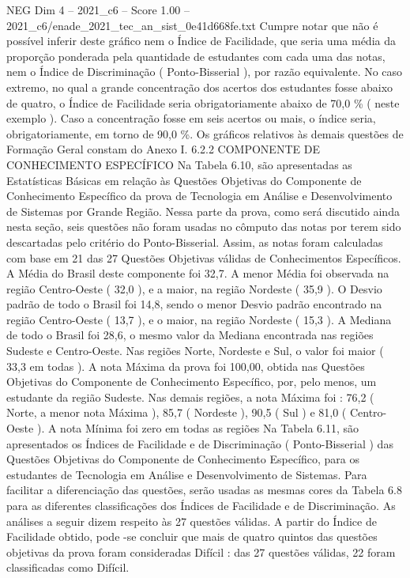 \begin{textsample}{NEG Dim 4 – 2021\_c6 – Score 1.00 – 2021\_c6/enade\_2021\_tec\_an\_sist\_0e41d668fe.txt}
Cumpre notar que não é possível inferir deste gráfico nem o Índice de Facilidade, que seria uma média da proporção ponderada pela quantidade de estudantes com cada uma das notas, nem o Índice de Discriminação ( Ponto-Bisserial ), por razão equivalente.
No caso extremo, no qual a grande concentração dos acertos dos estudantes fosse abaixo de quatro, o Índice de Facilidade seria obrigatoriamente abaixo de 70,0 \% ( neste exemplo ).
Caso a concentração fosse em seis acertos ou mais, o índice seria, obrigatoriamente, em torno de 90,0 \%.
Os gráficos relativos às demais questões de Formação Geral constam do Anexo I. 6.2.2 COMPONENTE DE CONHECIMENTO ESPECÍFICO Na Tabela 6.10, são apresentadas as Estatísticas Básicas em relação às Questões Objetivas do Componente de Conhecimento Específico da prova de Tecnologia em Análise e Desenvolvimento de Sistemas por Grande Região.
Nessa parte da prova, como será discutido ainda nesta seção, seis questões não foram usadas no cômputo das notas por terem sido descartadas pelo critério do Ponto-Bisserial.
Assim, as notas foram calculadas com base em 21 das 27 Questões Objetivas válidas de Conhecimentos Específicos.
A Média do Brasil deste componente foi 32,7.
A menor Média foi observada na região Centro-Oeste ( 32,0 ), e a maior, na região Nordeste ( 35,9 ).
O Desvio padrão de todo o Brasil foi 14,8, sendo o menor Desvio padrão encontrado na região Centro-Oeste ( 13,7 ), e o maior, na região Nordeste ( 15,3 ).
A Mediana de todo o Brasil foi 28,6, o mesmo valor da Mediana encontrada nas regiões Sudeste e Centro-Oeste.
Nas regiões Norte, Nordeste e Sul, o valor foi maior ( 33,3 em todas ).
A nota Máxima da prova foi 100,00, obtida nas Questões Objetivas do Componente de Conhecimento Específico, por, pelo menos, um estudante da região Sudeste.
Nas demais regiões, a nota Máxima foi : 76,2 ( Norte, a menor nota Máxima ), 85,7 ( Nordeste ), 90,5 ( Sul ) e 81,0 ( Centro-Oeste ).
A nota Mínima foi zero em todas as regiões Na Tabela 6.11, são apresentados os Índices de Facilidade e de Discriminação ( Ponto-Bisserial ) das Questões Objetivas do Componente de Conhecimento Específico, para os estudantes de Tecnologia em Análise e Desenvolvimento de Sistemas.
Para facilitar a diferenciação das questões, serão usadas as mesmas cores da Tabela 6.8 para as diferentes classificações dos Índices de Facilidade e de Discriminação.
As análises a seguir dizem respeito às 27 questões válidas.
A partir do Índice de Facilidade obtido, pode -se concluir que mais de quatro quintos das questões objetivas da prova foram consideradas Difícil : das 27 questões válidas, 22 foram classificadas como Difícil.

\end{textsample}
